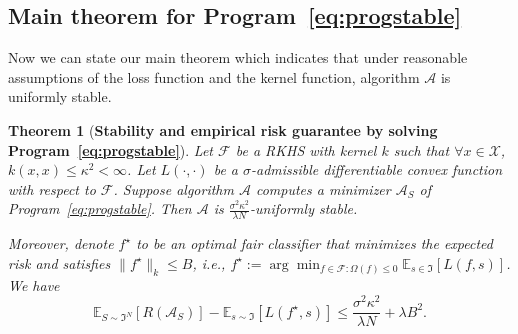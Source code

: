 \documentclass[11pt]{article}
\newcommand{\Exp}{\mathbb{E}}
\newtheorem{theorem}{Theorem}[section]
\newcommand{\calA}{\mathcal{A}}
\newcommand{\calF}{\mathcal{F}}
\newcommand{\calX}{\mathcal{X}}
\begin{document}
	
	
	\subsection{Main theorem for Program~\eqref{eq:progstable}}
	\label{sec:main}
	
	Now we can state our main theorem which indicates that under reasonable assumptions of the loss function and the kernel function, algorithm $\calA$ is uniformly stable.
	
	\begin{theorem}[\textbf{Stability and empirical risk guarantee by solving Program~\eqref{eq:progstable}}]
		\label{thm:stable}
		Let $\calF$ be a RKHS with kernel $k$ such that $\forall x\in \calX$, $k(x,x)\leq \kappa^2<\infty$. 
		Let $L(\cdot,\cdot)$ be a $\sigma$-admissible differentiable convex function with respect to $\calF$.
		Suppose algorithm $\calA$ computes a minimizer $\calA_S$ of Program~\eqref{eq:progstable}.
		Then $\calA$ is $\frac{\sigma^2 \kappa^2}{\lambda N}$-uniformly stable.
		
		Moreover, denote $f^\star$ to be an optimal fair classifier that minimizes the expected risk and satisfies $\|f^\star\|_k\leq B$, i.e., 
		$f^\star:= \arg \min_{f\in \calF: \Omega(f)\leq 0} \Exp_{s\in \Im}\left[ L(f,s)\right]$. 
		We have
		\[
		\Exp_{S\sim \Im^N} \left[R(\calA_S) \right] - \Exp_{s\sim \Im} \left[L(f^\star,s)\right] \leq \frac{\sigma^2 \kappa^2}{\lambda N}+\lambda B^2.
		\]
	\end{theorem}
	
\end{document}

